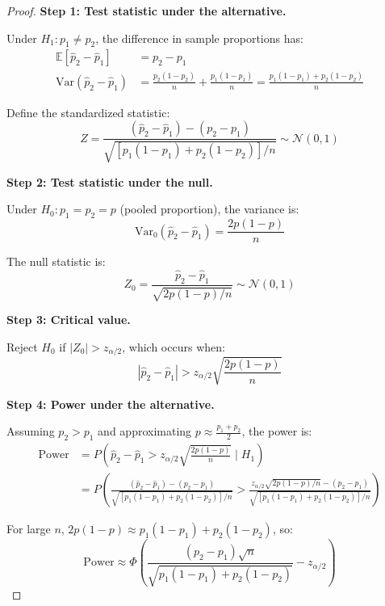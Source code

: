 \begin{proof}
\textbf{Step 1: Test statistic under the alternative.}

Under $H_1: p_1 \neq p_2$, the difference in sample proportions has:
\begin{align}
\mathbb{E}[\hat{p}_2 - \hat{p}_1] &= p_2 - p_1 \\
\text{Var}(\hat{p}_2 - \hat{p}_1) &= \frac{p_2(1-p_2)}{n} + \frac{p_1(1-p_1)}{n} = \frac{p_1(1-p_1) + p_2(1-p_2)}{n}
\end{align}

Define the standardized statistic:
\begin{equation}
Z = \frac{(\hat{p}_2 - \hat{p}_1) - (p_2 - p_1)}{\sqrt{[p_1(1-p_1) + p_2(1-p_2)]/n}} \sim \mathcal{N}(0, 1)
\end{equation}

\textbf{Step 2: Test statistic under the null.}

Under $H_0: p_1 = p_2 = p$ (pooled proportion), the variance is:
\begin{equation}
\text{Var}_0(\hat{p}_2 - \hat{p}_1) = \frac{2p(1-p)}{n}
\end{equation}

The null statistic is:
\begin{equation}
Z_0 = \frac{\hat{p}_2 - \hat{p}_1}{\sqrt{2p(1-p)/n}} \sim \mathcal{N}(0, 1)
\end{equation}

\textbf{Step 3: Critical value.}

Reject $H_0$ if $|Z_0| > z_{\alpha/2}$, which occurs when:
\begin{equation}
|\hat{p}_2 - \hat{p}_1| > z_{\alpha/2}\sqrt{\frac{2p(1-p)}{n}}
\end{equation}

\textbf{Step 4: Power under the alternative.}

Assuming $p_2 > p_1$ and approximating $p \approx \frac{p_1 + p_2}{2}$, the power is:
\begin{align}
\text{Power} &= P\left(\hat{p}_2 - \hat{p}_1 > z_{\alpha/2}\sqrt{\frac{2p(1-p)}{n}} \mid H_1\right) \\
&= P\left(\frac{(\hat{p}_2 - \hat{p}_1) - (p_2-p_1)}{\sqrt{[p_1(1-p_1) + p_2(1-p_2)]/n}} > \frac{z_{\alpha/2}\sqrt{2p(1-p)/n} - (p_2-p_1)}{\sqrt{[p_1(1-p_1) + p_2(1-p_2)]/n}}\right)
\end{align}

For large $n$, $2p(1-p) \approx p_1(1-p_1) + p_2(1-p_2)$, so:
\begin{equation}
\text{Power} \approx \Phi\left(\frac{(p_2-p_1)\sqrt{n}}{\sqrt{p_1(1-p_1) + p_2(1-p_2)}} - z_{\alpha/2}\right)
\end{equation}


\end{proof}
